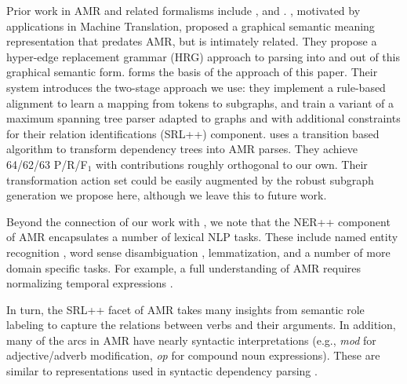 \documentclass[11pt]{article}
\newcommand\e[1]{\textit{#1}} %
\begin{document}
Prior work in AMR and related formalisms include , and .
, motivated by applications in Machine Translation, proposed a graphical semantic meaning representation that predates AMR, but is intimately related.
They propose a hyper-edge replacement grammar (HRG) approach to parsing into and out of this graphical semantic form.
 forms the basis of the approach of this paper.
Their system introduces the two-stage approach we use:
  they implement a rule-based alignment to learn a mapping from tokens to subgraphs, and
  train a variant of a maximum spanning tree parser adapted to graphs and 
  with additional constraints for their relation identifications (SRL++) component.
 uses a transition based algorithm to transform dependency trees into AMR parses.
They achieve 64/62/63 P/R/F$_1$ with contributions roughly orthogonal to our own.
Their transformation action set could be easily augmented by the robust subgraph generation we propose here,
  although we leave this to future work.

Beyond the connection of our work with , we note that 
the NER++ component of AMR encapsulates a number of lexical NLP tasks.
These include named entity recognition \cite{2007nadeau-ner,stanford-ner},
  word sense disambiguation \cite{1995yarowsky-wsd,2002banerjee-wsd},
  lemmatization, and a number of more domain specific tasks.
For example, a full understanding of AMR requires normalizing temporal
  expressions \cite{2010verhagen-tempeval,2010strotgen-temporal,2012chang-temporal}.
 
In turn, the SRL++ facet of AMR takes many insights from semantic role labeling
  \cite{2002gildea-srl,2004punyakanok-srl,srikumar2013-srl,das2014frame} to capture the
  relations between verbs and their arguments.
In addition, many of the arcs in AMR have nearly syntactic interpretations
  (e.g., \e{mod} for adjective/adverb modification, \e{op} for compound noun
  expressions).
These are similar to representations used in syntactic dependency parsing
  \cite{stanford-dependencies,2005mcdonald-dependency0,2006buchholz-conll}.
\end{document}
